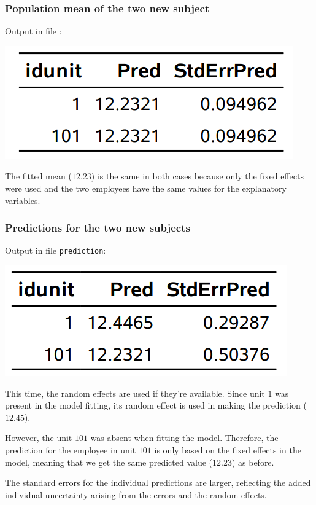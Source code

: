\documentclass{beamer}
\begin{document}
\begin{frame}[fragile]
\frametitle{Population mean of the two new subject}
Output in file :
\begin{center}
\includegraphics[width = 0.4\linewidth]{img/c6/slides7-e21}
\end{center}
\bi
\item The fitted mean ($12.23$) is the same in both cases because only the fixed effects were used and the two employees have the same values for the explanatory variables.
\ei
\end{frame}

\begin{frame}[fragile]
\frametitle{Predictions for the two new subjects}

Output in file \texttt{prediction}:
\begin{center}
\includegraphics[width = 0.4\linewidth]{img/c6/slides7-e22}
\end{center}
\bi
\item This time, the random effects are used if they're available. Since unit $1$ was present in the model fitting, its random effect is used in making the prediction ($12.45$). 
\item However, the unit
$101$ was absent when fitting the model. Therefore, the prediction for the employee in unit $101$ is only based on the fixed effects in the model, 
meaning that we get the same predicted value ($12.23$) as before.
\item The standard errors for the individual predictions are larger, reflecting the added individual uncertainty arising from the errors and the random effects.
\ei
\end{frame}
\end{document}
